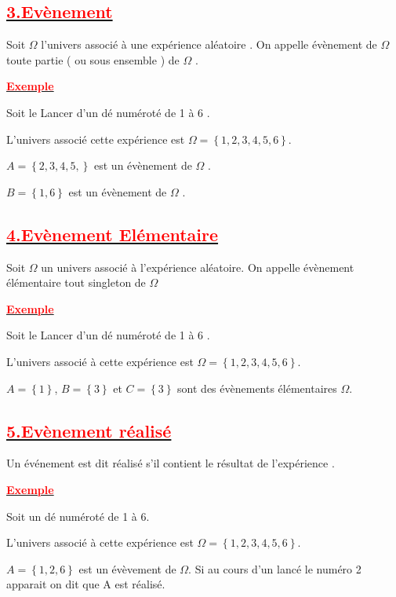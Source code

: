 \documentclass[12pt,a4paper]{article}
\begin{document}
\subsection*{\underline{\textbf{\textcolor{red}{3.Evènement}}}}
Soit $\Omega$ l’univers associé à une expérience aléatoire . On appelle évènement de $\Omega$ toute partie ( ou sous ensemble ) de $\Omega$ .

\underline{\textbf{\textcolor{red}{Exemple}}}

Soit le Lancer d’un dé numéroté de 1 à 6 .


L’univers associé cette expérience est $\Omega=\left\lbrace 1, 2, 3, 4, 5, 6\right\rbrace$.

$A=\left\lbrace 2, 3, 4, 5,\right\rbrace$ est un évènement de $\Omega$ .

$B=\left\lbrace 1, 6\right\rbrace$ est un évènement de $\Omega$ .

\subsection*{\underline{\textbf{\textcolor{red}{4.Evènement Elémentaire}}}}
Soit $\Omega$ un univers associé à l'expérience aléatoire. On appelle évènement élémentaire tout singleton de $\Omega$

\underline{\textbf{\textcolor{red}{Exemple}}}

Soit le Lancer d’un dé numéroté de 1 à 6 .

L’univers associé à cette expérience est $\Omega=\left\lbrace 1, 2, 3, 4, 5, 6\right\rbrace$.

$A=\left\lbrace 1 \right\rbrace $, $B=\left\lbrace 3 \right\rbrace $ et $C=\left\lbrace 3 \right\rbrace $ sont des évènements élémentaires $\Omega$.

\subsection*{\underline{\textbf{\textcolor{red}{5.Evènement réalisé}}}}
Un événement est dit réalisé s’il contient le résultat de l’expérience .

\underline{\textbf{\textcolor{red}{Exemple}}}

Soit un dé numéroté de 1 à 6.

L’univers associé à cette expérience est $\Omega = \left\lbrace 1, 2, 3, 4, 5, 6 \right\rbrace $.

$A = \left\lbrace 1, 2, 6 \right\rbrace $ est un évèvement de $\Omega$.
Si au cours d'un lancé le numéro 2 apparait on dit que A est réalisé.
\end{document}
